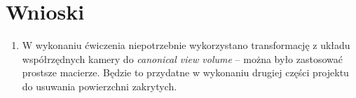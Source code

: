 \documentclass{article}
\begin{document}
\section{Wnioski}

    \begin{enumerate}
        \item W wykonaniu ćwiczenia niepotrzebnie wykorzystano transformację z układu współrzędnych
        kamery do \textit{canonical view volume} -- można było zastosować prostsze macierze. 
        Będzie to przydatne w wykonaniu drugiej części projektu do usuwania powierzchni zakrytych.
    \end{enumerate}
 
\end{document}
